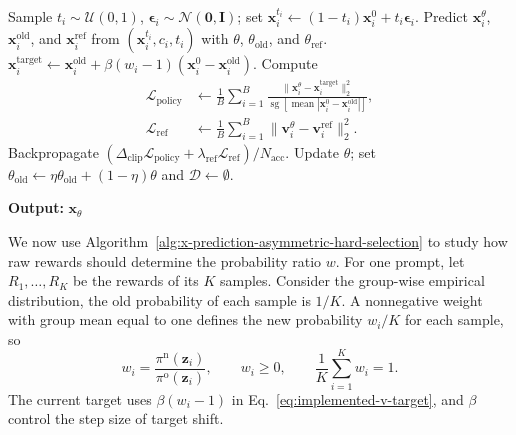 \documentclass{article} %
\begin{document}
\begin{algorithm}[H]
\begin{algorithmic}[1]
                \State Sample $t_i\sim\mathcal{U}(0,1)$,
                $\boldsymbol{\epsilon}_i\sim\mathcal{N}(\mathbf{0},\mathbf{I})$;
                set $\mathbf{x}_i^{t_i}\leftarrow
                (1-t_i)\mathbf{x}_i^0+t_i\boldsymbol{\epsilon}_i$.
                \State Predict $\mathbf{x}_i^\theta$,
                $\mathbf{x}_i^{\mathrm{old}}$, and $\mathbf{x}_i^{\mathrm{ref}}$
                from $(\mathbf{x}_i^{t_i},c_i,t_i)$ with
                $\theta$, $\theta_{\mathrm{old}}$, and $\theta_{\mathrm{ref}}$.
                \State $\mathbf{x}_i^{\mathrm{target}}\leftarrow
                \mathbf{x}_i^{\mathrm{old}}+
                \beta(w_i-1)(\mathbf{x}_i^0-\mathbf{x}_i^{\mathrm{old}})$.
                \State Compute
                \[
                    \begin{aligned}
                    \mathcal{L}_{\mathrm{policy}}
                    &\leftarrow\frac{1}{B}\sum_{i=1}^{B}
                    \frac{\|\mathbf{x}_i^\theta-\mathbf{x}_i^{\mathrm{target}}\|_2^2}
                    {\operatorname{sg}[\operatorname{mean}
                    |\mathbf{x}_i^0-\mathbf{x}_i^{\mathrm{old}}|]},\\
                    \mathcal{L}_{\mathrm{ref}}
                    &\leftarrow\frac{1}{B}\sum_{i=1}^{B}
                    \|\mathbf{v}_i^\theta-\mathbf{v}_i^{\mathrm{ref}}\|_2^2.
                    \end{aligned}
                \]
                \State Backpropagate
                $(\Delta_{\mathrm{clip}}\mathcal{L}_{\mathrm{policy}}+
                \lambda_{\mathrm{ref}}\mathcal{L}_{\mathrm{ref}})/N_{\mathrm{acc}}$.
            \EndFor
            \State Update $\theta$; set
            $\theta_{\mathrm{old}}\leftarrow
            \eta\theta_{\mathrm{old}}+(1-\eta)\theta$ and
            $\mathcal{D}\leftarrow\emptyset$.
        \EndFor
    \end{algorithmic}
    \textbf{Output:} $\mathbf{x}_\theta$
\end{algorithm}


We now use Algorithm~\ref{alg:x-prediction-asymmetric-hard-selection} to study how raw rewards
should determine the probability ratio $w$. For one prompt, let $R_1,\ldots,R_K$ be the rewards
of its $K$ samples. Consider the group-wise empirical distribution, the old probability of
each sample is $1/K$. A nonnegative weight with group mean equal to one defines
the new probability $w_i/K$ for each sample, so
\begin{equation}
w_i=\frac{\pi^{\mathrm{n}}(\mathbf z_i)}
{\pi^{\mathrm{o}}(\mathbf z_i)},
\qquad w_i\ge0,\qquad \frac1K\sum_{i=1}^{K}w_i=1.
\label{eq:group-probability-ratio}
\end{equation}
The current target uses $\beta(w_i-1)$ in
Eq.~\eqref{eq:implemented-v-target}, and $\beta$ control the step size of target shift. 
\end{document}
